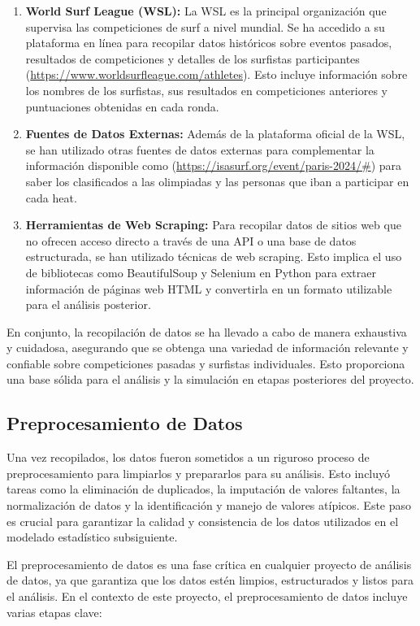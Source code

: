 \documentclass[12pt]{article}
\begin{document}
\begin{enumerate}
    \item \textbf{World Surf League (WSL):} La WSL es la principal organización que supervisa las competiciones de surf a nivel mundial. Se ha accedido a su plataforma en línea para recopilar datos históricos sobre eventos pasados, resultados de competiciones y detalles de los surfistas participantes (\url{https://www.worldsurfleague.com/athletes}). Esto incluye información sobre los nombres de los surfistas, sus resultados en competiciones anteriores y puntuaciones obtenidas en cada ronda.
    \item \textbf{Fuentes de Datos Externas:} Además de la plataforma oficial de la WSL, se han utilizado otras fuentes de datos externas para complementar la información disponible como (\url{https://isasurf.org/event/paris-2024/#}) para saber los clasificados a las olimpiadas y las personas que iban a participar en cada heat.
    \item \textbf{Herramientas de Web Scraping:} Para recopilar datos de sitios web que no ofrecen acceso directo a través de una API o una base de datos estructurada, se han utilizado técnicas de web scraping. Esto implica el uso de bibliotecas como BeautifulSoup y Selenium en Python para extraer información de páginas web HTML y convertirla en un formato utilizable para el análisis posterior.
\end{enumerate}

En conjunto, la recopilación de datos se ha llevado a cabo de manera exhaustiva y cuidadosa, asegurando que se obtenga una variedad de información relevante y confiable sobre competiciones pasadas y surfistas individuales. Esto proporciona una base sólida para el análisis y la simulación en etapas posteriores del proyecto.

\subsection*{Preprocesamiento de Datos}

Una vez recopilados, los datos fueron sometidos a un riguroso proceso de preprocesamiento para limpiarlos y prepararlos para su análisis. Esto incluyó tareas como la eliminación de duplicados, la imputación de valores faltantes, la normalización de datos y la identificación y manejo de valores atípicos. Este paso es crucial para garantizar la calidad y consistencia de los datos utilizados en el modelado estadístico subsiguiente.

El preprocesamiento de datos es una fase crítica en cualquier proyecto de análisis de datos, ya que garantiza que los datos estén limpios, estructurados y listos para el análisis. En el contexto de este proyecto, el preprocesamiento de datos incluye varias etapas clave:
\end{document}
